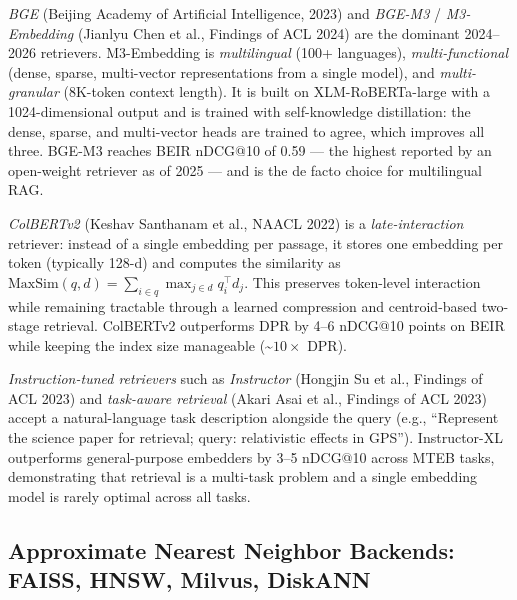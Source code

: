 \documentclass{article}
\begin{document}
\emph{BGE} (Beijing Academy of Artificial Intelligence, 2023) and \emph{BGE-M3} / \emph{M3-Embedding} (Jianlyu Chen et al., Findings of ACL 2024) are the dominant 2024--2026 retrievers. M3-Embedding is \emph{multilingual} (100+ languages), \emph{multi-functional} (dense, sparse, multi-vector representations from a single model), and \emph{multi-granular} (8K-token context length). It is built on XLM-RoBERTa-large with a 1024-dimensional output and is trained with self-knowledge distillation: the dense, sparse, and multi-vector heads are trained to agree, which improves all three. BGE-M3 reaches BEIR nDCG@10 of 0.59 --- the highest reported by an open-weight retriever as of 2025 --- and is the de facto choice for multilingual RAG.

\emph{ColBERTv2} (Keshav Santhanam et al., NAACL 2022) is a \emph{late-interaction} retriever: instead of a single embedding per passage, it stores one embedding per token (typically 128-d) and computes the similarity as \(\text{MaxSim}(q, d) = \sum_{i \in q} \max_{j \in d} q_i^\top d_j\). This preserves token-level interaction while remaining tractable through a learned compression and centroid-based two-stage retrieval. ColBERTv2 outperforms DPR by 4--6 nDCG@10 points on BEIR while keeping the index size manageable (\textasciitilde{}\(10\times\) DPR).

\emph{Instruction-tuned retrievers} such as \emph{Instructor} (Hongjin Su et al., Findings of ACL 2023) and \emph{task-aware retrieval} (Akari Asai et al., Findings of ACL 2023) accept a natural-language task description alongside the query (e.g., ``Represent the science paper for retrieval; query: relativistic effects in GPS''). Instructor-XL outperforms general-purpose embedders by 3--5 nDCG@10 across MTEB tasks, demonstrating that retrieval is a multi-task problem and a single embedding model is rarely optimal across all tasks.

\subsection{Approximate Nearest Neighbor Backends: FAISS, HNSW, Milvus, DiskANN}\label{approximate-nearest-neighbor-backends-faiss-hnsw-milvus-diskann}
\end{document}
